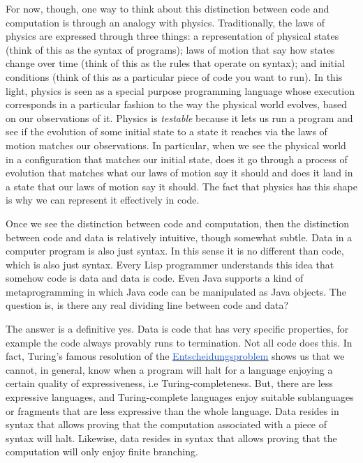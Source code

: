 \documentclass[runningheads]{llncs}
\begin{document}
\vspace{1\baselineskip}
For now, though, one way to think about this distinction between code and computation is through an analogy with physics. Traditionally, the laws of physics are expressed through three things: a representation of physical states (think of this as the syntax of programs); laws of motion that say how states change over time (think of this as the rules that operate on syntax); and initial conditions (think of this as a particular piece of code you want to run). In this light, physics is seen as a special purpose programming language whose execution corresponds in a particular fashion to the way the physical world evolves, based on our observations of it. Physics is \textit{testable} because it lets us run a program and see if the evolution of some initial state to a state it reaches via the laws of motion matches our observations. In particular, when we see the physical world in a configuration that matches our initial state, does it go through a process of evolution that matches what our laws of motion say it should and does it land in a state that our laws of motion say it should. The fact that physics has this shape is why we can represent it effectively in code.

\vspace{1\baselineskip}
Once we see the distinction between code and computation, then the distinction between code and data is relatively intuitive, though somewhat subtle. Data in a computer program is also just syntax. In this sense it is no different than code, which is also just syntax. Every Lisp programmer understands this idea that somehow code is data and data is code. Even Java supports a kind of metaprogramming in which Java code can be manipulated as Java objects. The question is, is there any real dividing line between code and data? 

\vspace{1\baselineskip}
The answer is a definitive yes. Data is code that has very specific properties, for example the code always provably runs to termination. Not all code does this. In fact, Turing’s famous resolution of the \href{https://en.wikipedia.org/wiki/Entscheidungsproblem}{\uline{\textcolor[HTML]{1155CC}{Entscheidungsproblem}}} shows us that we cannot, in general, know when a program will halt for a language enjoying a certain quality of expressiveness, i.e Turing-completeness. But, there are less expressive languages, and Turing-complete languages enjoy suitable sublanguages or fragments that are less expressive than the whole language. Data resides in syntax that allows proving that the computation associated with a piece of syntax will halt. Likewise, data resides in syntax that allows proving that the computation will only enjoy finite branching. 
\end{document}
